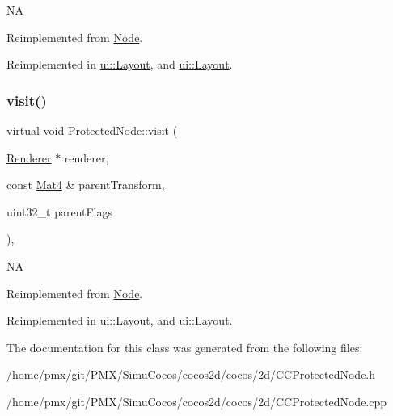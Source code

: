 NA 

Reimplemented from \hyperlink{classNode_a7d794a5e30745611ec33881a625edf26}{Node}.



Reimplemented in \hyperlink{classui_1_1Layout_a7857b109e0d674106c9fe22830ef4076}{ui\+::\+Layout}, and \hyperlink{classui_1_1Layout_a46a4f4f4836e1b9c985acb26f8fa4163}{ui\+::\+Layout}.

\mbox{\label{classProtectedNode_a705c838f46afa1b9eac5dae2aa4bc310}} 
\subsubsection{\texorpdfstring{visit()}{visit()}\hspace{0.1cm}{\footnotesize\ttfamily [2/2]}}
{\footnotesize\ttfamily virtual void Protected\+Node\+::visit (\begin{DoxyParamCaption}\item[{\hyperlink{classRenderer}{Renderer} $\ast$}]{renderer,  }\item[{const \hyperlink{classMat4}{Mat4} \&}]{parent\+Transform,  }\item[{uint32\+\_\+t}]{parent\+Flags }\end{DoxyParamCaption})\hspace{0.3cm}{\ttfamily [override]}, {\ttfamily [virtual]}}

NA 

Reimplemented from \hyperlink{classNode_a7d794a5e30745611ec33881a625edf26}{Node}.



Reimplemented in \hyperlink{classui_1_1Layout_a7857b109e0d674106c9fe22830ef4076}{ui\+::\+Layout}, and \hyperlink{classui_1_1Layout_a46a4f4f4836e1b9c985acb26f8fa4163}{ui\+::\+Layout}.



The documentation for this class was generated from the following files\+:\begin{DoxyCompactItemize}
\item 
/home/pmx/git/\+P\+M\+X/\+Simu\+Cocos/cocos2d/cocos/2d/C\+C\+Protected\+Node.\+h\item 
/home/pmx/git/\+P\+M\+X/\+Simu\+Cocos/cocos2d/cocos/2d/C\+C\+Protected\+Node.\+cpp\end{DoxyCompactItemize}
